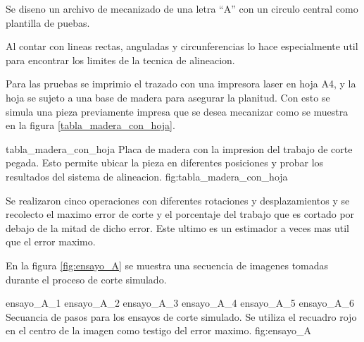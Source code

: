 Se diseno un archivo de mecanizado de una letra ``A'' con un circulo central como plantilla de puebas.\par
Al contar con lineas rectas, anguladas y circunferencias lo hace especialmente util para encontrar los limites de la tecnica de alineacion. \par
Para las pruebas se imprimio el trazado con una impresora laser en hoja A4, y la hoja se sujeto a una base de madera para asegurar la planitud. Con esto se simula una pieza previamente impresa que se desea mecanizar como se muestra en la figura \ref{tabla_madera_con_hoja}.\par

    {tabla_madera_con_hoja} {Placa de madera con la impresion del trabajo de corte pegada. Esto permite ubicar la pieza en diferentes posiciones y probar los resultados del sistema de alineacion.} {fig:tabla_madera_con_hoja}

   Se realizaron cinco operaciones con diferentes rotaciones y desplazamientos y se recolecto el maximo error de corte y el porcentaje del trabajo que es cortado por debajo de la mitad de dicho error. Este ultimo es un estimador a veces mas util que el error maximo.\par
   En la figura \ref{fig:ensayo_A} se muestra una secuencia de imagenes tomadas durante el proceso de corte simulado.

   \subfigthreethree
      {ensayo_A_1}
      {ensayo_A_2}
      {ensayo_A_3}
      {ensayo_A_4}
      {ensayo_A_5}
      {ensayo_A_6}
      {Secuancia de pasos para los ensayos de corte simulado. Se utiliza el recuadro rojo en el centro de la imagen como testigo del error maximo.}
      {fig:ensayo_A}

